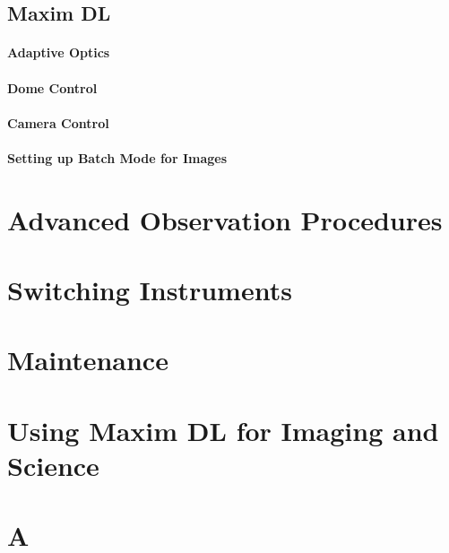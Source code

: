 \documentclass[12pt,twoside,a4paper]{report}
\begin{document}
\section{Maxim DL}
\subsubsection{Adaptive Optics}

\subsubsection{Dome Control}

\subsubsection{Camera Control}

\subsubsection{Setting up Batch Mode for Images}


\chapter{Advanced Observation Procedures}

\chapter{Switching Instruments}

\chapter{Maintenance}

\chapter{Using Maxim DL for Imaging and Science}

\appendix
\chapter{A}
\end{document}
